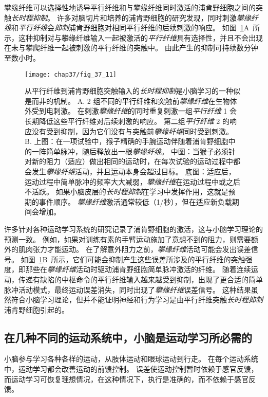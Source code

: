 攀缘纤维可以选择性地诱导平行纤维和与攀缘纤维同时激活的浦肯野细胞之间的突触\textit{长时程抑制}。
许多对脑切片和培养的浦肯野细胞的研究发现，同时刺激\textit{攀缘纤维}和\textit{平行纤维}会\textit{抑制}浦肯野细胞对相同平行纤维的后续刺激的响应。
如图~\ref{fig:37_11}A~所示，这种抑制对与攀缘纤维输入一起被激活的\textit{平行纤维}具有选择性，并且不会出现在未与攀爬纤维一起被刺激的平行纤维的突触中。
由此产生的抑制可持续数分钟至数小时。


\begin{figure}[htbp]
	\centering
	\texttt{[image: chap37/fig\_37\_11]}
	\caption{从平行纤维到浦肯野细胞突触输入的\textit{长时程抑制}是小脑学习的一种似是而非的机制。
		A. 2 组不同的平行纤维和突触前\textit{攀缘纤维}在生物体外受到电刺激。
		在刺激\textit{攀缘纤维}的同时重复刺激一组\textit{平行纤维} 1 会长期降低这些平行纤维对后续刺激的响应。
		第二组\textit{平行纤维} 2 的响应没有受到抑制，因为它们没有与突触前\textit{攀缘纤维}同时受到刺激\cite{ito1982climbing}。
		B. 上图：在一项试验中，猴子精确的手腕运动伴随着浦肯野细胞中的一阵简单脉冲，随后释放出一根\textit{攀缘纤维}。
		中图：当猴子必须针对新的阻力（适应）做出相同的运动时，在每次试验的运动过程中都会发生\textit{攀缘纤维}活动，并且运动本身会超过目标。
		底图：适应后，运动过程中简单脉冲的频率大大减弱，\textit{攀缘纤维}在运动过程中或之后不活跃。
		如果小脑皮层的\textit{长时程抑制}在学习中发挥作用，这就是预期的事件顺序。
		\textit{攀缘纤维}激活通常较低（1/秒），但在适应新负载期间会增加\cite{gilbert1977purkinje}。}
	\label{fig:37_11}
\end{figure}


许多针对各种运动学习系统的研究记录了浦肯野细胞的激活，这与小脑学习理论的预测一致。
例如，如果对训练有素的手臂运动施加了意想不到的阻力，则需要额外的肌肉张力才能运动。
在了解意外阻力之前，\textit{攀缘纤维}活动可能会发出误差信号。
如图~\ref{fig:37_11}B~所示，它们可能会抑制产生这些误差所涉及的平行纤维的突触强度，即那些在\textit{攀缘纤维}活动时驱动浦肯野细胞简单脉冲激活的纤维。
随着连续运动，传递有缺陷的中枢命令的平行纤维输入越来越受到抑制，出现了更合适的简单脉冲活动模式，最终运动误差消失，同时出现了\textit{攀缘纤维}误差信号。
这种结果虽然符合小脑学习理论，但并不能证明神经和行为学习是由平行纤维突触\textit{长时程抑制}浦肯野细胞引起的。



\subsection{在几种不同的运动系统中，小脑是运动学习所必需的}

小脑参与学习各种各样的运动，从肢体运动和眼球运动到行走。
在每个运动系统中，运动学习都会改善运动的前馈控制。
误差使运动控制暂时依赖于感官反馈，而运动学习可恢复理想情况，在这种情况下，执行是准确的，而不依赖于感官反馈。


